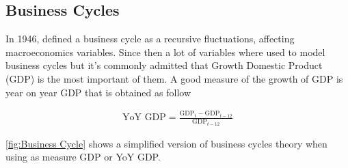 \documentclass[12pt,a4paper,oneside]{book}
\begin{document}
\subsection{Business Cycles}
\label{sec:Business Cycles}

In 1946, \citeauthor{mitchell_measuring_1946} defined a business cycle as a recursive fluctuations, affecting macroeconomics variables. Since then a lot of variables where used to model business cycles but it's commonly admitted that Growth Domestic Product (GDP) is the most important of them. 
A good measure of the growth of GDP is year on year GDP that is obtained as follow

\begin{eqnarray}
	\mbox{YoY GDP} = \frac{\mbox{GDP}_t - \mbox{GDP}_{t-12}}{\mbox{GDP}_{t-12}}      \label{eq:YoY GDP}
\end{eqnarray}

\autoref{fig:Business Cycle} shows a simplified version of business cycles theory when using as measure GDP or YoY GDP.
\end{document}
